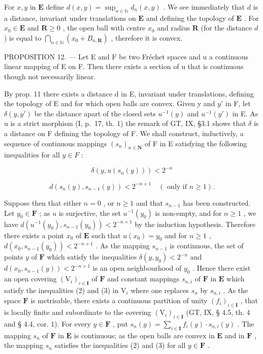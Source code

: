 For \(x, y\) in \(\mathbf{E}\) define \(d(x, y) = \sup_{n \in \mathbb{N}} d_n(x, y)\) . We see immediately that \(d\) is a distance, invariant under translations on \(\mathbf{E}\) and defining the topology of \(\mathbf{E}\) . For \(x_0 \in \mathbf{E}\) and \(\mathbf{R} \geqslant 0\) , the open ball with centre \(x_0\) and radius \(\mathbf{R}\) (for the distance \(d\) ) is equal to \(\bigcap_{n \in \mathbb{N}} (x_0 + B_{n,\mathbf{R}})\) , therefore it is convex.

PROPOSITION 12. --- Let E and F be two Fréchet spaces and u a continuous linear mapping of E on F. Then there exists a section of u that is continuous though not necessarily linear.

By prop. 11 there exists a distance d in E, invariant under translations, defining the topology of E and for which open balls are convex. Given y and \(y'\) in F, let \(\delta(y, y')\) be the distance apart of the closed sets \(u^{-1}(y)\) and \(u^{-1}(y')\) in E. As u is a strict morphism (I, p.~17, th. 1) the remark of GT, IX, §3.1 shows that \(\delta\) is a distance on F defining the topology of F. We shall construct, inductively, a sequence of continuous mappings \((s_n)_{n \in \mathbf{N}}\) of F in E satisfying the following inequalities for all \(y \in F\) :

\[
\delta (y, u (s _ {n} (y))) <   2 ^ {- n}\tag{2}
\]

\[
d \left(s _ {n} (y), s _ {n - 1} (y)\right) <   2 ^ {- n + 1} \quad (\text { only   if } n \geqslant 1).\tag{3}
\]

Suppose then that either \(n = 0\) , or \(n \geqslant 1\) and that \(s_{n-1}\) has been constructed. Let \(y_0 \in \mathbf{F}\) ; as \(u\) is surjective, the set \(u^{-1}(y_0)\) is non-empty, and for \(n \geqslant 1\) , we have \(d(u^{-1}(y_0), s_{n-1}(y_0)) < 2^{-n+1}\) by the induction hypothesis. Therefore there exists a point \(x_0\) of \(\mathbf{E}\) such that \(u(x_0) = y_0\) and for \(n \geqslant 1\) , \(d(x_0, s_{n-1}(y_0)) < 2^{-n+1}\) . As the mapping \(s_{n-1}\) is continuous, the set of points \(y\) of \(\mathbf{F}\) which satisfy the inequalities \(\delta(y, y_0) < 2^{-n}\) and \(d(x_0, s_{n-1}(y)) < 2^{-n+1}\) is an open neighbourhood of \(y_0\) . Hence there exist an open covering \((\mathrm{V}_i)_{i \in \mathbf{I}}\) of \(\mathbf{F}\) and constant mappings \(s_{n,i}\) of \(\mathbf{F}\) in \(\mathbf{E}\) which satisfy the inequalities (2) and (3) in \(\mathrm{V}_i\) where one replaces \(s_n\) by \(s_{n,i}\) . As the space \(\mathbf{F}\) is metrisable, there exists a continuous partition of unity \((f_i)_{i \in \mathbf{I}}\) , that is locally finite and subordinate to the covering \((\mathrm{V}_i)_{i \in \mathbf{I}}\) (GT, IX, § 4.5, th. 4 and § 4.4, cor. 1). For every \(y \in \mathbf{F}\) , put \(s_n(y) = \sum_{i \in \mathbf{I}} f_i(y) \cdot s_{n,i}(y)\) . The mapping \(s_n\) of \(\mathbf{F}\) in \(\mathbf{E}\) is continuous; as the open balls are convex in \(\mathbf{E}\) and in \(\mathbf{F}\) , the mapping \(s_n\) satisfies the inequalities (2) and (3) for all \(y \in \mathbf{F}\) .

